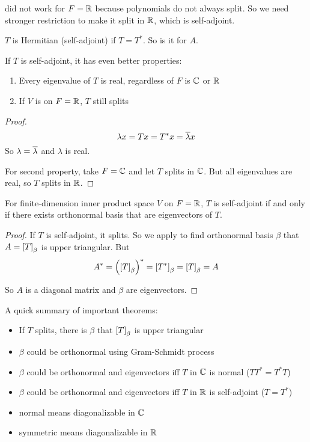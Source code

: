  did not work for $F=\mathbb{R}$ because polynomials do not always split. So we need stronger restriction to make it split in $\mathbb{R}$, which is self-adjoint.

\begin{definition}
    $T$ is Hermitian (self-adjoint) if $T = T^*$. So is it for $A$.
\end{definition}

If $T$ is self-adjoint, it has even better properties:
\begin{enumerate}
    \item Every eigenvalue of $T$ is real, regardless of $F$ is $\mathbb{C}$ or $\mathbb{R}$
    \item If $V$ is on $F=\mathbb{R}$, $T$ still splits
\end{enumerate}
\begin{proof}
    \begin{equation*}
        \lambda x = Tx = T^* x = \overline{\lambda} x
    \end{equation*}
    So $\lambda = \overline{\lambda}$ and $\lambda$ is real.
    
    For second property, take $F=\mathbb{C}$ and let $T$ splits in $\mathbb{C}$. But all eigenvalues are real, so $T$ splits in $\mathbb{R}$.
\end{proof}

\begin{theorem}
    For finite-dimension inner product space $V$ on $F=\mathbb{R}$, $T$ is self-adjoint if and only if there exists orthonormal basis that are eigenvectors of $T$.
\end{theorem}
\begin{proof}
    If $T$ is self-adjoint, it splits. So we apply  to find orthonormal basis $\beta$ that $A = \coordinate{T}_\beta$ is upper triangular. But
    \begin{equation*}
        A^* = \left(\coordinate{T}_\beta\right)^* = \coordinate{T^*}_\beta = \coordinate{T}_\beta = A
    \end{equation*}
    
    So $A$ is a diagonal matrix and $\beta$ are eigenvectors.
\end{proof}

A quick summary of important theorems:
\begin{itemize}
    \item If $T$ splits, there is $\beta$ that $\coordinate{T}_\beta$ is upper triangular
    \item $\beta$ could be orthonormal using Gram-Schmidt process
    \item $\beta$ could be orthonormal and eigenvectors iff $T$ in $\mathbb{C}$ is normal ($TT^* = T^*T$)
    \item $\beta$ could be orthonormal and eigenvectors iff $T$ in $\mathbb{R}$ is self-adjoint ($T = T^*$)
    \item normal means diagonalizable in $\mathbb{C}$
    \item symmetric means diagonalizable in $\mathbb{R}$
\end{itemize}



